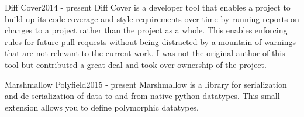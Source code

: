 %
%
%


\begin{projects}
	\project
	{Diff Cover}{2014 - present}
	{}
	{Diff Cover is a developer tool that enables a project to build up its code coverage and style requirements over time by running reports on changes to a project rather than the project as a whole. This enables enforcing rules for future pull requests without being distracted by a mountain of warnings that are not relevant to the current work. I was not the original author of this tool but contributed a great deal and took over ownership of the project.}
	{}
				
	\project
	{Marshmallow Polyfield}{2015 - present}
	{}
	{Marshmallow is a library for serialization and de-serialization of data to and from native python datatypes. This small extension allows you to define polymorphic datatypes. }
	{}

\end{projects}